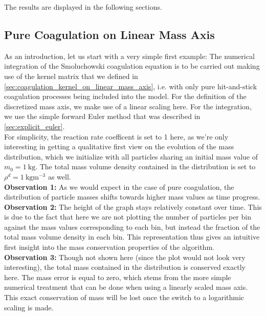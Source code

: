     The results are displayed in the following sections.

    \clearpage\subsection{Pure Coagulation on Linear Mass Axis}

        As an introduction, let us start with a very simple first example: The numerical 
        integration of the Smoluchowski coagulation equation is to be carried out making 
        use of the kernel matrix that we defined in 
        \cref{sec:coagulation_kernel_on_linear_mass_axis}, i.e. with only pure 
        hit-and-stick coagulation processes being included into the model.
        For the definition of the discretized mass axis, we make use of a linear scaling 
        here. For the integration, we use the simple forward Euler method that was 
        described in \cref{sec:explicit_euler}. \\

        For simplicity, the reaction rate coefficent is set to 1 here, as we're only 
        interesting in getting a qualitative first view on the evolution of the 
        mass distribution, which we initialize with all particles sharing an initial mass 
        value of $m_0 = 1\ \text{kg}$. The total mass volume density contained in the 
        distribution is set to $\rho^d=1\ \text{kg} \text{m}^{-3}$ as well. \\

        \textbf{Observation 1:} As we would expect in the case of pure coagulation, the
        distribution of particle masses shifts towards higher mass values as time progress. \\

        \textbf{Observation 2:} The height of the graph stays relatively constant over time. 
        This is due to the fact that here we are not plotting the number of particles per bin 
        against the mass values corresponding to each bin, but instead the fraction of the 
        total mass volume density in each bin. This representation thus gives an intuitive 
        first insight into the mass conservation properties of the algorithm. \\

        \textbf{Observation 3:} Though not shown here (since the plot would not look very
        interesting), the total mass contained in the distribution is conserved exactly here.
        The mass error is equal to zero, which stems from the more simple numerical 
        treatment that can be done when using a linearly scaled mass axis. This exact conservation 
        of mass will be lost once the switch to a logarithmic scaling is made. \\


